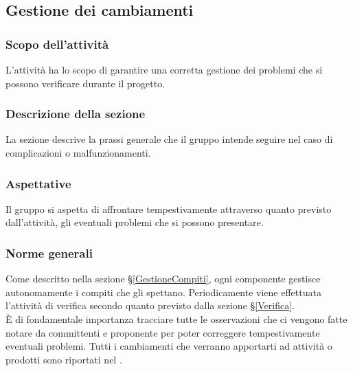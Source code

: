 \subsection{Gestione dei cambiamenti}\label{GestioneCambiamenti}
\subsubsection{Scopo dell'attività} 
L'attività ha lo scopo di garantire una corretta gestione dei problemi che si possono verificare durante il progetto.

\subsubsection{Descrizione della sezione} 
La sezione descrive la prassi generale che il gruppo intende seguire nel caso di complicazioni o malfunzionamenti.

\subsubsection{Aspettative}
Il gruppo si aspetta di affrontare tempestivamente attraverso quanto previsto dall'attività, gli eventuali problemi che si possono presentare.

\subsubsection{Norme generali} \label{GCambiamenti_Norme}
Come descritto nella sezione \S\ref{GestioneCompiti}, ogni componente gestisce autonomamente i compiti che gli spettano. Periodicamente viene effettuata l'attività di verifica secondo quanto previsto dalla sezione \S\ref{Verifica}.\\ È di fondamentale importanza tracciare tutte le osservazioni che ci vengono fatte notare da committenti e proponente per poter correggere tempestivamente eventuali problemi. 
Tutti i cambiamenti che verranno apportarti ad attività o prodotti sono riportati nel {\PdQ}.

